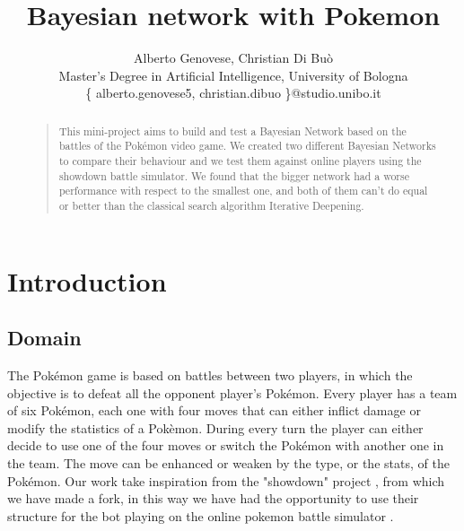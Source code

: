 \documentclass[letterpaper]{article}
\begin{document}
%
\title{Bayesian network with Pokemon}
\author{Alberto Genovese, Christian Di Buò\\
Master's Degree in Artificial Intelligence, University of Bologna\\
\{ alberto.genovese5, christian.dibuo \}@studio.unibo.it
}
\maketitle



\begin{abstract}
\begin{quote}
This mini-project aims to build and test a Bayesian Network based on the battles of the Pokémon video game. We created two different Bayesian Networks to compare their behaviour and we test them against online players using the showdown battle simulator. We found that the bigger network had a worse performance with respect to the smallest one, and both of them can't do equal or better than the classical search algorithm Iterative Deepening.



\end{quote}
\end{abstract}


\section{Introduction}
\subsection{Domain}
The Pokémon game is based on battles between two players, in which the objective is to defeat all the opponent player's Pokémon. Every player has a team of six Pokémon, each one with four moves that can either inflict damage or modify the statistics of a Pokèmon. During every turn the player can either decide to use one of the four moves or switch the Pokémon with another one in the team. The move can be enhanced or weaken by the type, or the stats, of the Pokémon.
Our work take inspiration from the "showdown" project \cite{bot}, from which we have made a fork, in this way we have had the opportunity to use their structure for the bot playing on the online pokemon battle simulator \cite{showdown}.
\end{document}
